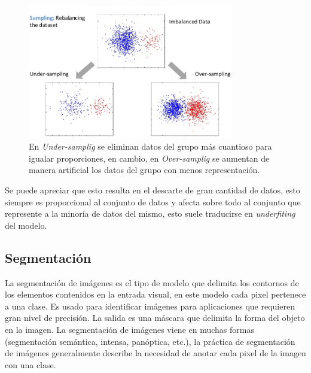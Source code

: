 \documentclass[letter,12pt]{report}
\begin{document}
\begin{figure}[H]
    \centering
    \includegraphics[width=0.8\textwidth]{balance}
    \caption{En \textit{Under-samplig} se eliminan datos del grupo más cuantioso para
        igualar proporciones, en cambio, en \textit{Over-samplig} se aumentan de manera
    artificial los datos del grupo con menos representación.}
    \label{fig:balance}
\end{figure}

Se puede apreciar que esto resulta en el descarte de gran cantidad de datos,
esto siempre es proporcional al conjunto de datos y afecta sobre todo al
conjunto que represente a la minoría de datos del mismo, esto suele traducirse
en \textit{underfiting} del modelo.

\subsection{Segmentación}
La segmentación \cite{Segmenta} de imágenes es el tipo de modelo que delimita los
contornos de los elementos contenidos en la entrada visual, en este modelo cada pixel
pertenece a una clase. Es usado para identificar imágenes para aplicaciones que requieren
gran nivel de precisión. La salida es una máscara que delimita la forma del objeto en la
imagen. La segmentación de imágenes viene en muchas formas (segmentación semántica,
intensa, panóptica, etc.), la práctica de segmentación de imágenes generalmente describe
la necesidad de anotar cada pixel de la imagen con una clase.
\end{document}
